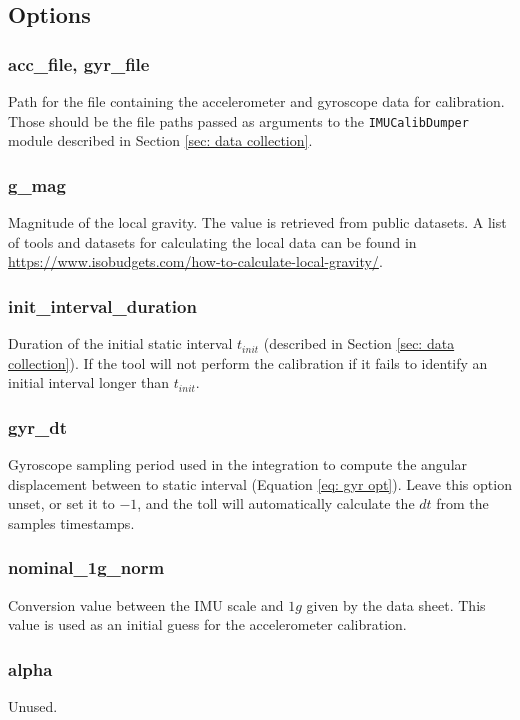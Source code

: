 \subsection{Options}\label{subsec: options}

\subsubsection*{acc\_file, gyr\_file}
Path for the file containing the accelerometer and gyroscope data for calibration. Those should be the file paths passed as arguments to the \texttt{IMUCalibDumper} module described in Section \ref{sec: data collection}.

\subsubsection*{g\_mag}
Magnitude of the local gravity. The value is retrieved from public datasets. A list of tools and datasets for calculating the local data can be found in \url{https://www.isobudgets.com/how-to-calculate-local-gravity/}.

\subsubsection*{init\_interval\_duration}
Duration of the initial static interval $t_{init}$ (described in Section \ref{sec: data collection}). If the tool will not perform the calibration if it fails to identify an initial interval longer than $t_{init}$.

\subsubsection*{gyr\_dt}
Gyroscope sampling period used in the integration  to compute the angular displacement between to static interval (Equation \ref{eq: gyr opt}).
%
Leave this option unset, or set it to $-1$, and the toll will automatically calculate the $dt$ from the samples timestamps.

\subsubsection*{nominal\_1g\_norm}
Conversion value between the IMU scale and $1g$ given by the data sheet. This value is used as an initial guess for the accelerometer calibration.

\subsubsection*{alpha}
Unused.

